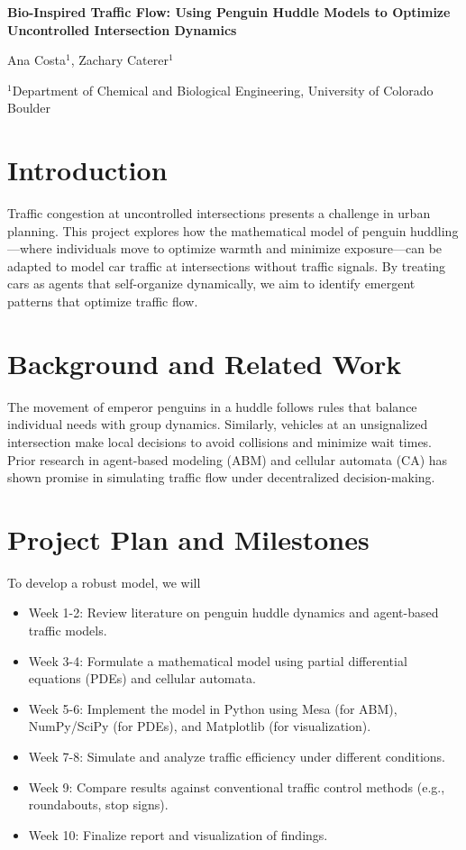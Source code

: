 \documentclass[10pt]{article}
\begin{document}
\begin{center}    
    \textbf{\Large 
    Bio-Inspired Traffic Flow: Using Penguin Huddle Models to Optimize Uncontrolled Intersection Dynamics
    }\\
    
    \vspace{0.5cm}

    Ana Costa$^1$, Zachary Caterer$^1$\\
    
    \vspace{0.5cm}
    
    $^1$Department of Chemical and Biological Engineering, University of Colorado Boulder\\
\end{center}


\section*{Introduction}
Traffic congestion at uncontrolled intersections presents a challenge in urban planning. This project explores how the mathematical model of penguin huddling—where individuals move to optimize warmth and minimize exposure—can be adapted to model car traffic at intersections without traffic signals. By treating cars as agents that self-organize dynamically, we aim to identify emergent patterns that optimize traffic flow.

\section*{Background and Related Work}
The movement of emperor penguins in a huddle follows rules that balance individual needs with group dynamics. Similarly, vehicles at an unsignalized intersection make local decisions to avoid collisions and minimize wait times. Prior research in agent-based modeling (ABM) and cellular automata (CA) has shown promise in simulating traffic flow under decentralized decision-making.

\section*{Project Plan and Milestones}
To develop a robust model, we will

\begin{itemize}
    \item Week 1-2: Review literature on penguin huddle dynamics and agent-based traffic models.
    \item Week 3-4: Formulate a mathematical model using partial differential equations (PDEs) and cellular automata.
    \item Week 5-6: Implement the model in Python using Mesa (for ABM), NumPy/SciPy (for PDEs), and Matplotlib (for visualization).
    \item Week 7-8: Simulate and analyze traffic efficiency under different conditions.
    \item Week 9: Compare results against conventional traffic control methods (e.g., roundabouts, stop signs).
    \item Week 10: Finalize report and visualization of findings.
\end{itemize}
\end{document}
